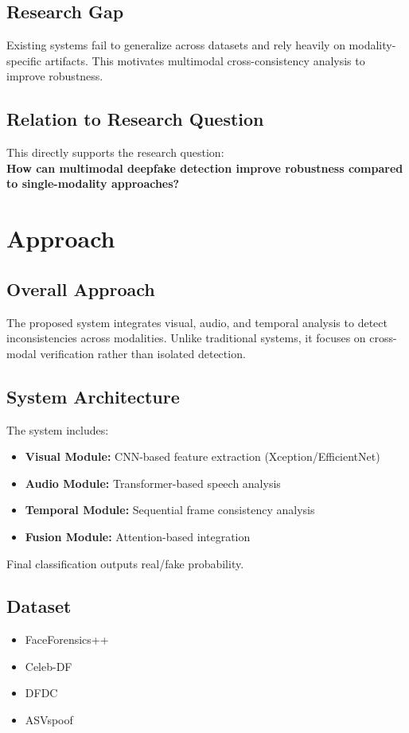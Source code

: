 \documentclass[a4paper, 12pt, oneside]{Thesis}  %
\begin{document}
\section{Research Gap}
\label{sec:research_gap}
Existing systems fail to generalize across datasets and rely heavily on modality-specific artifacts. This motivates multimodal cross-consistency analysis to improve robustness.

\section{Relation to Research Question}
\label{sec:relation_to_research_question}
This directly supports the research question:\\
\textbf{How can multimodal deepfake detection improve robustness compared to single-modality approaches?}


\chapter{Approach} 
\label{ch:approach}
\section{Overall Approach}
\label{sec:overall_approach}
The proposed system integrates visual, audio, and temporal analysis to detect inconsistencies across modalities. Unlike traditional systems, it focuses on cross-modal verification rather than isolated detection.

\section{System Architecture}
\label{sec:system_architecture}
The system includes:
\begin{itemize}
\item \textbf{Visual Module:} CNN-based feature extraction (Xception/EfficientNet)
\item \textbf{Audio Module:} Transformer-based speech analysis
\item \textbf{Temporal Module:} Sequential frame consistency analysis
\item \textbf{Fusion Module:} Attention-based integration
\end{itemize}

Final classification outputs real/fake probability.

\section{Dataset}
\label{sec:dataset}
\begin{itemize}
\item FaceForensics++ \cite{rossler2019faceforensics}
\item Celeb-DF
\item DFDC
\item ASVspoof \cite{asvspoof2021}
\end{itemize}
\end{document}
